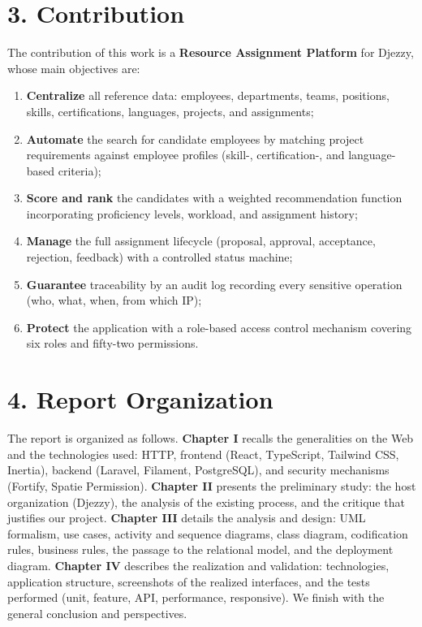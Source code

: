\documentclass{bts-report}
\begin{document}
\section*{3. Contribution}
The contribution of this work is a \textbf{Resource Assignment Platform} for Djezzy, whose main objectives are:
\begin{enumerate}
  \item \textbf{Centralize} all reference data: employees, departments, teams, positions, skills, certifications, languages, projects, and assignments;
  \item \textbf{Automate} the search for candidate employees by matching project requirements against employee profiles (skill-, certification-, and language-based criteria);
  \item \textbf{Score and rank} the candidates with a weighted recommendation function incorporating proficiency levels, workload, and assignment history;
  \item \textbf{Manage} the full assignment lifecycle (proposal, approval, acceptance, rejection, feedback) with a controlled status machine;
  \item \textbf{Guarantee} traceability by an audit log recording every sensitive operation (who, what, when, from which IP);
  \item \textbf{Protect} the application with a role-based access control mechanism covering six roles and fifty-two permissions.
\end{enumerate}

\section*{4. Report Organization}
The report is organized as follows. \textbf{Chapter I} recalls the generalities on the Web and the technologies used: HTTP, frontend (React, TypeScript, Tailwind CSS, Inertia), backend (Laravel, Filament, PostgreSQL), and security mechanisms (Fortify, Spatie Permission). \textbf{Chapter II} presents the preliminary study: the host organization (Djezzy), the analysis of the existing process, and the critique that justifies our project. \textbf{Chapter III} details the analysis and design: UML formalism, use cases, activity and sequence diagrams, class diagram, codification rules, business rules, the passage to the relational model, and the deployment diagram. \textbf{Chapter IV} describes the realization and validation: technologies, application structure, screenshots of the realized interfaces, and the tests performed (unit, feature, API, performance, responsive). We finish with the general conclusion and perspectives.
\end{document}
